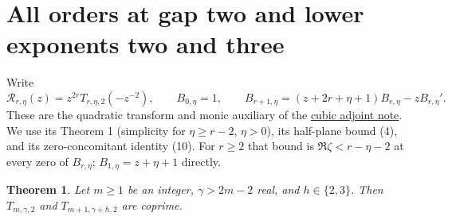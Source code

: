 \documentclass[11pt]{article}
\newtheorem{theorem}{Theorem}
\begin{document}
\section{All orders at gap two and lower exponents two and three}
Write
\[
 \mathcal R_{r,\eta}(z)=z^{2r}T_{r,\eta,2}(-z^{-2}),\qquad
 B_{0,\eta}=1,\qquad
 B_{r+1,\eta}=(z+2r+\eta+1)B_{r,\eta}-zB_{r,\eta}'.
\]
These are the quadratic transform and monic auxiliary of the
\href{CUBIC_ADJOINT_STABILITY_SFC.tex}{cubic adjoint note}.
We use its Theorem 1 (simplicity for $\eta\ge r-2$, $\eta>0$),
its half-plane bound (4), and its zero-concomitant identity (10).
For $r\ge2$ that bound is
$\Re\zeta<r-\eta-2$ at every zero of $B_{r,\eta}$;
$B_{1,\eta}=z+\eta+1$ directly.

\begin{theorem}\label{thm:gap-two-shape-offset}
Let $m\ge1$ be an integer, $\gamma>2m-2$ real, and $h\in\{2,3\}$.
Then $T_{m,\gamma,2}$ and $T_{m+1,\gamma+h,2}$ are coprime.
\end{theorem}
\end{document}
